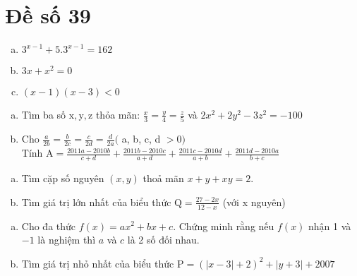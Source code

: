 \section{Đề số 39}

\begin{bt} 
	\hfill
	\begin{enumerate}[a.]
		\item $3^{x-1}+5.3^{x-1}=162$
		\item $3 x+x^2=0$
		\item $(x-1)(x-3)<0$
	\end{enumerate}
	\loigiai{} 
\end{bt}

\begin{bt}
	\hfill
	\begin{enumerate}[a.]
		\item Tìm ba số $\mathrm{x}, \mathrm{y}, \mathrm{z}$ thỏa mãn: $\frac{x}{3}=\frac{y}{4}=\frac{z}{5}$ và $2 x^2+2 y^2-3 z^2=-100$
		\item Cho $\frac{a}{2 b}=\frac{b}{2 c}=\frac{c}{2 d}=\frac{d}{2 a}($ a, b, c, d $>0)$
		\\Tính $\mathrm{A}=\frac{2011 a-2010 b}{c+d}+\frac{2011 b-2010 c}{a+d}+\frac{2011 c-2010 d}{a+b}+\frac{2011 d-2010 a}{b+c}$
	\end{enumerate}
	\loigiai{} 
\end{bt}

\begin{bt}
	\hfill 
	\begin{enumerate}[a.]
		\item Tìm cặp số nguyên $(x, y)$ thoả mãn $x+y+x y=2$.
		\item Tìm giá trị lớn nhất của biểu thức $\mathrm{Q}=\frac{27-2 x}{12-x}$ (với x nguyên)
	\end{enumerate}
	\loigiai{} 
\end{bt}

\begin{bt}
	\hfill 
	\begin{enumerate}[a.]
		\item Cho đa thức $f(x)=a x^2+b x+c$. Chứng minh rằng nếu $f(x)$ nhận 1 và $-1$ là nghiệm thì $a$ và $c$ là 2 số đối nhau.
		\item Tìm giá trị nhỏ nhất của biểu thức $\mathrm{P}=(|x-3|+2)^2+|y+3|+2007$
	\end{enumerate}
	\loigiai{} 
\end{bt}

